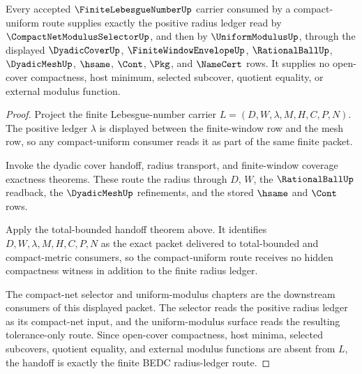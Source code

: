 \begin{theorem}
\label{thm:finite-lebesgue-number-compact-uniform-selector-handoff}
Every accepted $\FiniteLebesgueNumberUp$ carrier consumed by a compact-uniform route supplies exactly the positive radius ledger read by $\CompactNetModulusSelectorUp$, and then by $\UniformModulusUp$, through the displayed $\DyadicCoverUp$, $\FiniteWindowEnvelopeUp$, $\RationalBallUp$, $\DyadicMeshUp$, $\hsame$, $\Cont$, $\Pkg$, and $\NameCert$ rows. It supplies no open-cover compactness, host minimum, selected subcover, quotient equality, or external modulus function.
\end{theorem}
\begin{proof}
Project the finite Lebesgue-number carrier $L=(D,W,\lambda,M,H,C,P,N)$. The positive ledger $\lambda$ is displayed between the finite-window row and the mesh row, so any compact-uniform consumer reads it as part of the same finite packet.

Invoke the dyadic cover handoff, radius transport, and finite-window coverage exactness theorems. These route the radius through $D$, $W$, the $\RationalBallUp$ readback, the $\DyadicMeshUp$ refinements, and the stored $\hsame$ and $\Cont$ rows.

Apply the total-bounded handoff theorem above. It identifies $D,W,\lambda,M,H,C,P,N$ as the exact packet delivered to total-bounded and compact-metric consumers, so the compact-uniform route receives no hidden compactness witness in addition to the finite radius ledger.

The compact-net selector and uniform-modulus chapters are the downstream consumers of this displayed packet. The selector reads the positive radius ledger as its compact-net input, and the uniform-modulus surface reads the resulting tolerance-only route. Since open-cover compactness, host minima, selected subcovers, quotient equality, and external modulus functions are absent from $L$, the handoff is exactly the finite BEDC radius-ledger route.
\end{proof}


